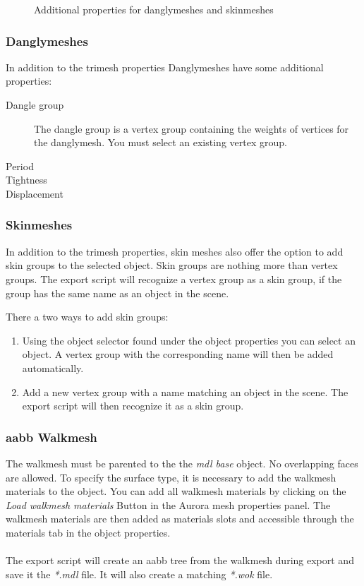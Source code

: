 \documentclass[a4paper]{article}
\begin{document}
\begin{figure}%
  \centering
{}\qquad
{}
\caption[Additional Porperties]{Additional properties for danglymeshes and skinmeshes}%
  \label{fig:addprops}%
\end{figure}

\subsubsection{Danglymeshes}
In addition to the trimesh properties Danglymeshes have some additional properties:
\begin{description}
    \item[Dangle group] The dangle group is a vertex group containing the weights of vertices for the danglymesh. You must select an existing vertex group.
    \item[Period] 
    \item[Tightness]
    \item[Displacement] 
\end{description}

\subsubsection{Skinmeshes}
In addition to the trimesh properties, skin meshes also offer the option to add skin groups to the selected object. Skin groups are nothing more than vertex groups. The export script will recognize a vertex group as a skin group, if the group has the same name as an object in the scene.

There a two ways to add skin groups:
\begin{enumerate}
  \item Using the object selector found under the object properties you can select an object. A vertex group with the corresponding name will then be added automatically.
  \item Add a new vertex group with a name matching an object in the scene. The export script will then recognize it as a skin group.
\end{enumerate}

\subsubsection{aabb Walkmesh}
The walkmesh must be parented to the the {\textit{mdl base}} object. No overlapping faces are allowed. To specify the surface type, it is necessary to add the walkmesh materials to the object. You can add all walkmesh materials by clicking on the {\textit{Load walkmesh materials}} Button in the Aurora mesh properties panel. The walkmesh materials are then added as materials slots and accessible through the materials tab in the object properties. \\ \\
The export script will create an aabb tree from the walkmesh during export and save it the {\textit{*.mdl}} file. It will also create a matching {\textit{*.wok}} file.
\end{document}

